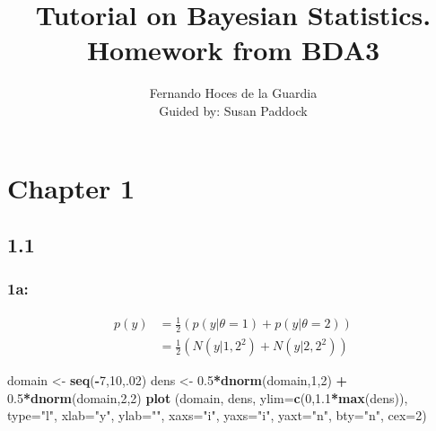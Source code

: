 \documentclass[]{article}
\title{Tutorial on Bayesian Statistics. Homework from BDA3}
\author{Fernando Hoces de la Guardia \\ Guided by: Susan Paddock}
\date{}
\newenvironment{Shaded}{\begin{snugshade}}{\end{snugshade}}
\newcommand{\KeywordTok}[1]{\textcolor[rgb]{0.13,0.29,0.53}{\textbf{#1}}}
\newcommand{\DataTypeTok}[1]{\textcolor[rgb]{0.13,0.29,0.53}{#1}}
\newcommand{\DecValTok}[1]{\textcolor[rgb]{0.00,0.00,0.81}{#1}}
\newcommand{\FloatTok}[1]{\textcolor[rgb]{0.00,0.00,0.81}{#1}}
\newcommand{\StringTok}[1]{\textcolor[rgb]{0.31,0.60,0.02}{#1}}
\newcommand{\OperatorTok}[1]{\textcolor[rgb]{0.81,0.36,0.00}{\textbf{#1}}}
\newcommand{\NormalTok}[1]{#1}
\begin{document}
\maketitle

\section{Chapter 1}\label{chapter-1}

\subsection{1.1}\label{section}

\subsubsection{1a:}\label{a}

\[
\begin{aligned}
p(y)  &= \frac{1}{2} \left( p(y| \theta = 1) + p(y| \theta = 2) \right) \nonumber\\
      &= \frac{1}{2} \left( N(y|1,2^{2}) + N(y|2,2^{2}) \right)
\end{aligned}
\]

\begin{Shaded}
\begin{Highlighting}[]
\NormalTok{domain          <-}\StringTok{ }\KeywordTok{seq}\NormalTok{(}\OperatorTok{-}\DecValTok{7}\NormalTok{,}\DecValTok{10}\NormalTok{,.}\DecValTok{02}\NormalTok{)}
\NormalTok{dens            <-}\StringTok{ }\FloatTok{0.5}\OperatorTok{*}\KeywordTok{dnorm}\NormalTok{(domain,}\DecValTok{1}\NormalTok{,}\DecValTok{2}\NormalTok{) }\OperatorTok{+}\StringTok{ }\FloatTok{0.5}\OperatorTok{*}\KeywordTok{dnorm}\NormalTok{(domain,}\DecValTok{2}\NormalTok{,}\DecValTok{2}\NormalTok{)}
\KeywordTok{plot}\NormalTok{ (domain, dens, }\DataTypeTok{ylim=}\KeywordTok{c}\NormalTok{(}\DecValTok{0}\NormalTok{,}\FloatTok{1.1}\OperatorTok{*}\KeywordTok{max}\NormalTok{(dens)),}
\DataTypeTok{type=}\StringTok{"l"}\NormalTok{, }\DataTypeTok{xlab=}\StringTok{"y"}\NormalTok{, }\DataTypeTok{ylab=}\StringTok{""}\NormalTok{, }\DataTypeTok{xaxs=}\StringTok{"i"}\NormalTok{,}
\DataTypeTok{yaxs=}\StringTok{"i"}\NormalTok{, }\DataTypeTok{yaxt=}\StringTok{"n"}\NormalTok{, }\DataTypeTok{bty=}\StringTok{"n"}\NormalTok{, }\DataTypeTok{cex=}\DecValTok{2}\NormalTok{)}
\end{Highlighting}
\end{Shaded}
\end{document}
